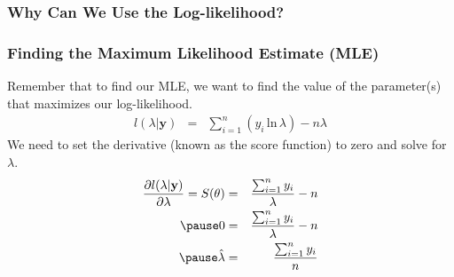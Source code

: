 \documentclass[handout]{beamer}
\begin{document}
\begin{frame}
\frametitle{Why Can We Use the Log-likelihood?}
\pause


\begin{figure}
\begin{center}
\end{center}
\end{figure}
\end{frame}

\begin{frame}
\frametitle{Finding the Maximum Likelihood Estimate (MLE)}
\pause
Remember that to find our MLE, we want to find the value of the
parameter(s) that maximizes our log-likelihood.
\pause
\begin{eqnarray*}
l(\lambda | \mathbf{y}) &=& \sum_{i=1}^n (y_i \, \mathrm{ln} \, \lambda)
- n\lambda 
\end{eqnarray*}
\pause
We need to set the derivative (known as the score function) to zero and solve for $\lambda$.
\pause
\begin{eqnarray*}
\frac{\partial l(\lambda | \mathbf{y}) }{\partial \lambda} = S(\theta)
&=& \frac{\sum_{i=1}^n y_i}{\lambda} - n \\
\pause
0 &=& \frac{\sum_{i=1}^n y_i}{\lambda} - n \\
\pause
\hat{\lambda} &=& \frac{\sum_{i=1}^n y_i}{n}
\end{eqnarray*}
\end{frame}
\end{document}
